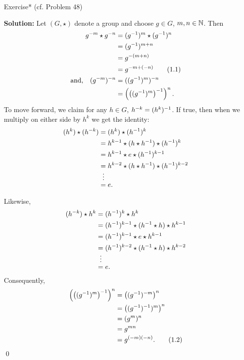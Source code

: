 \documentclass[../algebraNotesMSRI-UP2016.tex]{subfiles}
\begin{document}
\begin{frame}
\begin{block}{Exercise* (cf. Problem 48)}
\end{block}
\vspace{-0.75pc}
\textbf{Solution:}
Let $(G,\star)$ denote a group and choose $g\in G$, $m,n\in\mathbb N$.  Then
\begin{align*}
g^{-m}\star g^{-n} &= (g^{-1})^m\star (g^{-1})^n \\
	&= (g^{-1})^{m+n} \\
	&= g^{-(m+n)} \\
	&= g^{-m+(-n)} \tag{1.1} \\
\text{and,}\quad (g^{-m})^{-n} &= ((g^{-1})^m)^{-n} \\
	&= \left(\left((g^{-1})^m\right)^{-1}\right)^n.
\end{align*}
To move forward, we claim for any $h\in G$, $h^{-k}=(h^k)^{-1}$.  If true, then when we multiply on either side by $h^k$ we get the identity:
\begin{align*}
(h^k)\star (h^{-k}) &= (h^k)\star (h^{-1})^k \\
	&= h^{k-1}\star (h\star h^{-1})\star (h^{-1})^k \\
	&= h^{k-1}\star e \star (h^{-1})^{k-1} \\
	&= h^{k-2}\star (h\star h^{-1})\star (h^{-1})^{k-2} \\[-5pt]
	&\;\;\vdots \\[-5pt]
	&= e.
\end{align*}
\end{frame}

\begin{frame}
Likewise,
\begin{align*}
(h^{-k})\star h^k &= (h^{-1})^k\star h^k \\
	&= (h^{-1})^{k-1}\star (h^{-1}\star h)\star h^{k-1} \\
	&= (h^{-1})^{k-1}\star e \star h^{k-1} \\
	&= (h^{-1})^{k-2}\star (h^{-1}\star h)\star h^{k-2} \\[-5pt]
	&\;\;\vdots \\[-5pt]
	&= e.
\end{align*}
Consequently,
\begin{align*}	
 \left(\left((g^{-1})^m\right)^{-1}\right)^n &= \left((g^{-1})^{-m}\right)^n \\
	&= \left((g^{-1})^{-1})^m\right)^n \\
	&= (g^m)^n \\
	&= g^{mn} \\[-1pt]
	&= g^{(-m)(-n)}. \tag{1.2}
\end{align*}
\qed
\end{frame}
\end{document}
